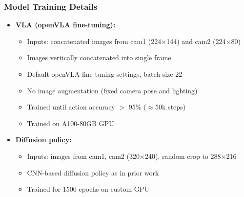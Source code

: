 \documentclass{beamer}
\begin{document}
\begin{frame}
  \frametitle{Model Training Details}
  \small
  \begin{itemize}
    \item \textbf{VLA (openVLA fine-tuning):}
      \begin{itemize}
        \item Inputs: concatenated images from cam1 (224$\times$144) and cam2 (224$\times$80)
        \item Images vertically concatenated into single frame
        \item Default openVLA fine-tuning settings, batch size 22
        \item No image augmentation (fixed camera pose and lighting)
        \item Trained until action accuracy $>$ 95\% ($\approx$50k steps)
        \item Trained on A100-80GB GPU
      \end{itemize}
    \item \textbf{Diffusion policy:}
      \begin{itemize}
        \item Inputs: images from cam1, cam2 (320$\times$240), random crop to 288$\times$216
        \item CNN-based diffusion policy as in prior work
        \item Trained for 1500 epochs on custom GPU
      \end{itemize}
  \end{itemize}
\end{frame}
\end{document}
